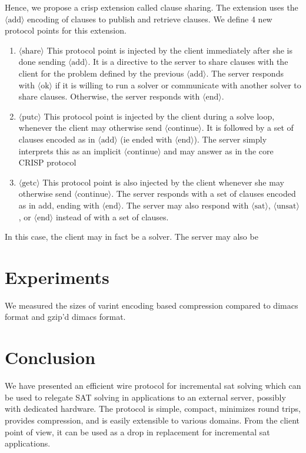 \documentclass{article}
\newcommand\proto[1]{$\langle\mbox{#1}\rangle$}
\begin{document}
Hence, we propose a crisp extension called clause sharing.  The extension
uses the \proto{add} encoding of clauses to publish and retrieve clauses.
We define 4 new protocol points for this extension.
\begin{enumerate}
	\item \proto{share} This protocol point is injected by the client
		immediately after she is done sending \proto{add}.  It is a directive
		to the server to share clauses with the client for the problem defined
		by the previous \proto{add}.  The server responds with \proto{ok} if
		it is willing to run a solver or communicate with another solver to share
		clauses.  Otherwise, the server responds with \proto{end}.
	\item \proto{putc} This protocol point is injected by the client
		during a solve loop, whenever the client may otherwise send
		\proto{continue}.  It is followed by a set of clauses encoded
		as in \proto{add} (ie ended with \proto{end}).  The server simply interprets this as an
		implicit \proto{continue} and may answer as in the core CRISP
		protocol

	\item \proto{getc}
		This protocol point is also injected by the client whenever she
		may otherwise send \proto{continue}.  The server responds with
		a set of clauses encoded as in add, ending with \proto{end}. The
		server may also respond with \proto{sat}, \proto{unsat}, or \proto{end}
		instead of with a set of clauses.
\end{enumerate}

In this case, the client may in fact be a solver.  The server may also be 


\section{Experiments}
\label{section:exp}
We measured the sizes of varint encoding based compression compared to
dimacs format and gzip'd dimacs format.


\section{Conclusion}
\label{section:conc}
We have presented an efficient wire protocol for incremental sat solving which 
can be used to relegate SAT solving in applications to an external server,
possibly with dedicated hardware.  The protocol is simple, compact, minimizes
round trips, provides compression, and is easily extensible to various domains.
From the client point of view, it can be used as a drop in replacement for incremental 
sat applications.  
\end{document}
